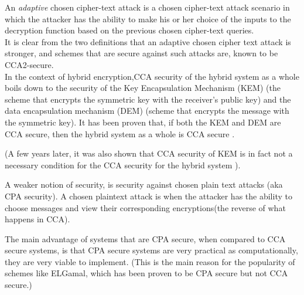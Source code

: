 An \emph{adaptive} chosen cipher-text attack is a chosen cipher-text attack scenario in which the attacker has the ability to make his or her choice of the inputs to the decryption function based on the previous chosen cipher-text queries.\\

It is clear from the two definitions that an adaptive chosen cipher text attack is stronger, and schemes that are secure against such attacks are, known to be CCA2-secure.\\

In the context of hybrid encryption,CCA security of the hybrid system as a whole boils down to the security of the Key Encapsulation Mechanism (KEM) (the scheme that encrypts the symmetric key with the receiver's public key) and the data encapsulation mechanism (DEM) (scheme that encrypts the message with the symmetric key).
It has been proven that, if both the KEM and DEM are CCA secure, then the hybrid system as a whole is CCA secure \cite{cryptoeprint:2001:108}.

(A few years later, it was also shown that CCA security of KEM is in fact not a necessary condition for the CCA security for the hybrid system \cite{kuro_des}).

A weaker notion of security, is security against chosen plain text attacks (aka CPA security).
A chosen plaintext attack is when the attacker has the ability to choose messages and view their corresponding encryptions(the reverse of what happens in CCA).

The main advantage of systems that are CPA secure, when compared to CCA secure systems, is that CPA secure systems are very practical as computationally, they are very viable to implement.
(This is the main reason for the popularity of schemes like ELGamal, which has been proven to be CPA secure but not CCA secure.)

